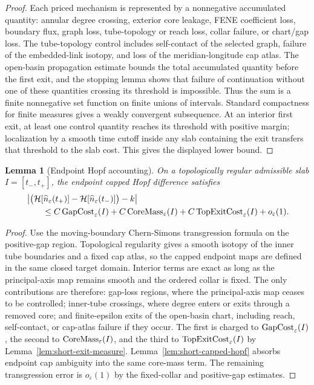 \documentclass[11pt]{article}
\newtheorem{lemma}[theorem]{Lemma}
\theoremstyle{definition}
\newcommand{\eps}{\varepsilon}
\newcommand{\Hopf}{\mathcal H}
\begin{document}
\begin{proof}
Each priced mechanism is represented by a nonnegative accumulated quantity:
annular degree crossing, exterior core leakage, FENE coefficient loss, boundary
flux, graph loss, tube-topology or reach loss, collar failure, or chart/gap
loss.  The tube-topology control includes self-contact of the selected graph,
failure of the embedded-link isotopy, and loss of the meridian-longitude cap
atlas.  The open-basin propagation estimate bounds the total accumulated
quantity before the first exit, and the stopping lemma shows that failure of
continuation without one of these quantities crossing its threshold is
impossible.  Thus the sum is a finite nonnegative set function on finite unions
of intervals.  Standard compactness for finite measures gives a weakly
convergent subsequence.  At an interior first exit, at least one control quantity reaches
its threshold with positive margin; localization by a smooth time cutoff inside
any slab containing the exit transfers that threshold to the slab cost.  This
gives the displayed lower bound.
\end{proof}

\begin{lemma}[Endpoint Hopf accounting]
\label{lem:short-endpoint-hopf}
On a topologically regular admissible slab \(I=[t_-,t_+]\), the endpoint capped
Hopf difference satisfies
\[
\begin{aligned}
&\left|
        \bigl(
        \Hopf[\widehat n_\eps(t_+)]
        -
        \Hopf[\widehat n_\eps(t_-)]
        \bigr)
        -
        k
\right|
\\
&\qquad\le
        C\,{\rm GapCost}_\eps(I)
        +
        C\,{\rm CoreMass}_\eps(I)
        +
        C\,{\rm TopExitCost}_\eps(I)
        +
        o_\eps(1).
\end{aligned}
\]
\end{lemma}

\begin{proof}
Use the moving-boundary Chern-Simons transgression formula on the positive-gap
region.  Topological regularity gives a smooth isotopy of the inner tube
boundaries and a fixed cap atlas, so the capped endpoint maps are defined in the
same closed target domain.  Interior terms are exact as long as the
principal-axis map remains smooth and the ordered collar is fixed.  The only
contributions are therefore: gap-loss regions, where the principal-axis map
ceases to be controlled; inner-tube crossings, where degree enters or exits
through a removed core; and finite-epsilon exits of the open-basin chart,
including reach, self-contact, or cap-atlas failure if they occur.  The first is
charged to
\({\rm GapCost}_\eps(I)\), the second to \({\rm CoreMass}_\eps(I)\), and the
third to \({\rm TopExitCost}_\eps(I)\) by Lemma~\ref{lem:short-exit-measure}.
Lemma~\ref{lem:short-capped-hopf} absorbs endpoint cap ambiguity into the same
core-mass term.  The remaining transgression error is \(o_\eps(1)\) by the
fixed-collar and positive-gap estimates.
\end{proof}
\end{document}
